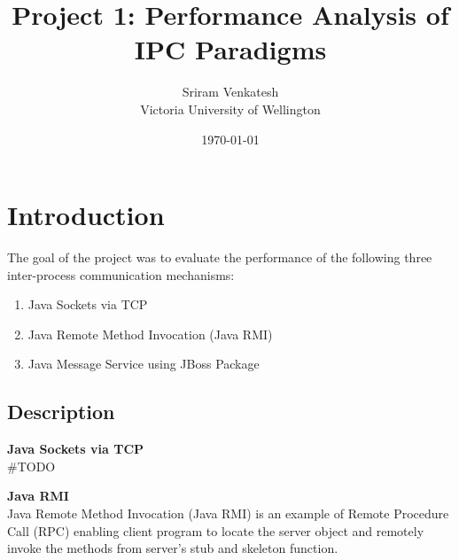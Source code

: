 \documentclass{article}
\title{Project 1: Performance Analysis of IPC Paradigms } %
\author{Sriram Venkatesh \\ Victoria University of Wellington} %
\date{\today} %
\begin{document}
\maketitle %



\section{Introduction}
The goal of the project was to evaluate the performance of the following three inter-process communication mechanisms:

\begin{enumerate}
\item Java Sockets via TCP
\item Java Remote Method Invocation (Java RMI)
\item Java Message Service using JBoss Package
\end{enumerate}

\subsection{Description}
\textbf{Java Sockets via TCP} \\ 
#TODO




\textbf{Java RMI} \\
Java Remote Method Invocation (Java RMI) is an example of Remote Procedure Call (RPC) enabling client program to locate the server object and remotely invoke the methods from server's stub and skeleton function. \\
\end{document}
